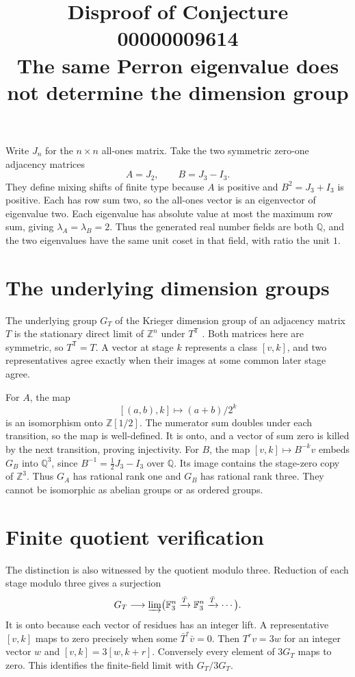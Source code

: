 \documentclass[11pt]{article}
\title{Disproof of Conjecture 00000009614\\
\large The same Perron eigenvalue does not determine the dimension group}
\author{}
\date{}
\begin{document}
\maketitle

Write \(J_n\) for the \(n\times n\) all-ones matrix. Take the two
symmetric zero-one adjacency matrices
\[
 A=J_2,\qquad B=J_3-I_3.
\]
They define mixing shifts of finite type because \(A\) is positive
and \(B^2=J_3+I_3\) is positive. Each has row sum two, so the
all-ones vector is an eigenvector of eigenvalue two. Each eigenvalue
has absolute value at most the maximum row sum, giving
\(\lambda_A=\lambda_B=2\). Thus the generated real number fields
are both \(\mathbb Q\), and the two eigenvalues have the same unit
coset in that field, with ratio the unit \(1\).

\section*{The underlying dimension groups}

The underlying group \(G_T\) of the Krieger dimension group of an
adjacency matrix \(T\) is the stationary direct limit of
\(\mathbb Z^n\) under \(T^{\mathsf T}\)
\cite[Section~3]{matsumoto}. Both matrices here are symmetric,
so \(T^{\mathsf T}=T\). A vector at stage \(k\) represents a
class \([v,k]\), and two representatives agree exactly when their
images at some common later stage agree.

For \(A\), the map
\[
  [(a,b),k]\longmapsto (a+b)/2^k
\]
is an isomorphism onto \(\mathbb Z[1/2]\). The numerator sum
doubles under each transition, so the map is well-defined.
It is onto, and a vector of sum zero is killed by the next
transition, proving injectivity. For \(B\), the map
\([v,k]\longmapsto B^{-k}v\) embeds \(G_B\) into \(\mathbb Q^3\),
since \(B^{-1}=\frac12J_3-I_3\) over \(\mathbb Q\). Its image
contains the stage-zero copy of \(\mathbb Z^3\). Thus \(G_A\)
has rational rank one and \(G_B\) has rational rank three.
They cannot be isomorphic as abelian groups or as ordered groups.

\section*{Finite quotient verification}

The distinction is also witnessed by the quotient modulo three.
Reduction of each stage modulo three gives a surjection
\[
  G_T\longrightarrow
  \varinjlim\bigl(\mathbb F_3^n\xrightarrow{\bar T}
                 \mathbb F_3^n\xrightarrow{\bar T}\cdots\bigr).
\]
It is onto because each vector of residues has an integer lift.
A representative \([v,k]\) maps to zero precisely when some
\(\bar T^r\bar v=0\). Then \(T^r v=3w\) for an integer vector \(w\)
and \([v,k]=3[w,k+r]\). Conversely every element of \(3G_T\)
maps to zero. This identifies the finite-field limit with
\(G_T/3G_T\).
\end{document}
